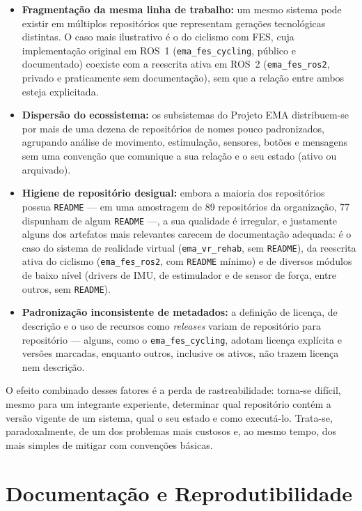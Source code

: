 \begin{itemize}
	\item \textbf{Fragmentação da mesma linha de trabalho:} um mesmo sistema pode existir em
	      múltiplos repositórios que representam gerações tecnológicas distintas. O caso mais
	      ilustrativo é o do ciclismo com FES, cuja implementação original em ROS~1
	      (\texttt{ema\_fes\_cycling}, público e documentado) coexiste com a reescrita ativa
	      em ROS~2 (\texttt{ema\_fes\_ros2}, privado e praticamente sem documentação), sem que
	      a relação entre ambos esteja explicitada.
	\item \textbf{Dispersão do ecossistema:} os subsistemas do Projeto EMA distribuem-se por
	      mais de uma dezena de repositórios de nomes pouco padronizados, agrupando análise
	      de movimento, estimulação, sensores, botões e mensagens sem uma convenção que
	      comunique a sua relação e o seu estado (ativo ou arquivado).
	\item \textbf{Higiene de repositório desigual:} embora a maioria dos repositórios possua
	      \texttt{README} --- em uma amostragem de 89 repositórios da organização, 77
	      dispunham de algum \texttt{README} ---, a sua qualidade é irregular, e justamente
	      alguns dos artefatos mais relevantes carecem de documentação adequada: é o caso do
	      sistema de realidade virtual (\texttt{ema\_vr\_rehab}, sem \texttt{README}), da
	      reescrita ativa do ciclismo (\texttt{ema\_fes\_ros2}, com \texttt{README} mínimo) e
	      de diversos módulos de baixo nível (drivers de IMU, de estimulador e de sensor de
	      força, entre outros, sem \texttt{README}).
	\item \textbf{Padronização inconsistente de metadados:} a definição de licença, de
	      descrição e o uso de recursos como \emph{releases} variam de repositório para
	      repositório --- alguns, como o \texttt{ema\_fes\_cycling}, adotam licença explícita
	      e versões marcadas, enquanto outros, inclusive os ativos, não trazem licença nem
	      descrição.
\end{itemize}

O efeito combinado desses fatores é a perda de rastreabilidade: torna-se difícil, mesmo para
um integrante experiente, determinar qual repositório contém a versão vigente de um sistema,
qual o seu estado e como executá-lo. Trata-se, paradoxalmente, de um dos problemas mais
custosos e, ao mesmo tempo, dos mais simples de mitigar com convenções básicas.

\section{Documentação e Reprodutibilidade}
\label{sec:diag-doc}


